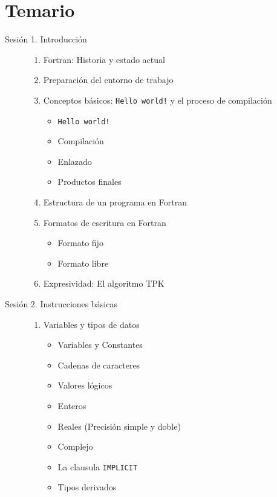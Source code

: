 \section{Temario}


\begin{description}
  \item[Sesión 1. Introducción]\hfill
    \begin{enumerate}
      \item Fortran: Historia y estado actual
      \item Preparación del entorno de trabajo
      \item Conceptos básicos: \texttt{Hello world!} y el proceso de compilación
        \begin{itemize}
          \item \texttt{Hello world!}
          \item Compilación
          \item Enlazado
          \item Productos finales
        \end{itemize}
      \item Estructura de un programa en Fortran
      \item Formatos de escritura en Fortran
        \begin{itemize}
          \item Formato fijo
          \item Formato libre
        \end{itemize}
      \item Expresividad: El algoritmo TPK
    \end{enumerate}

  \item[Sesión 2. Instrucciones básicas]\hfill
    \begin{enumerate}
      \item Variables y tipos de datos
        \begin{itemize}
          \item Variables y Constantes
          \item Cadenas de caracteres
          \item Valores lógicos
          \item Enteros
          \item Reales (Precisión simple y doble)
          \item Complejo
          \item La clausula \texttt{IMPLICIT}
          \item Tipos derivados
        \end{itemize}


\end{enumerate}
\end{description}
